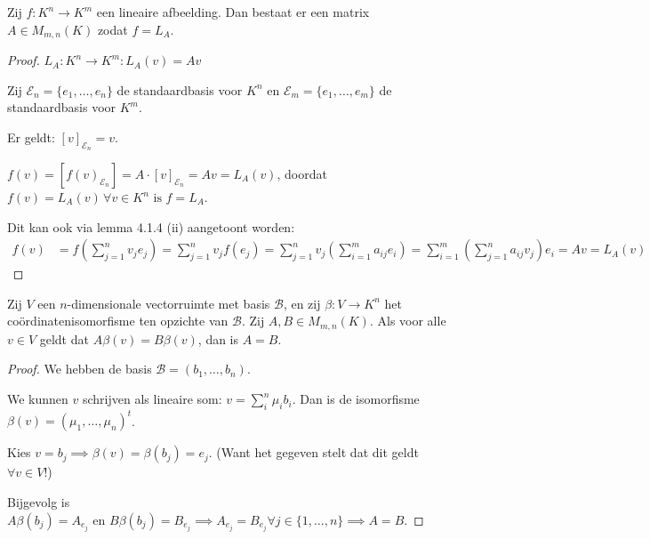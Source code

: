 \begin{gevolg}[4.1.6]
    Zij $f \colon K^n \to K^m$ een lineaire afbeelding. Dan bestaat er een matrix $A \in M_{m,n}(K)$ zodat $f = L_A$.
\end{gevolg}
\begin{proof}
    \(L_A: K^n \to K^m: L_A(v) = Av\)

    Zij \(\mathcal{E}_n = \{e_1, \dots, e_n\}\) de standaardbasis voor \(K^n\)
    en \(\mathcal{E}_m = \{e_1, \dots, e_m\}\) de standaardbasis voor \(K^m\).

    Er geldt: \([v]_{\mathcal{E}_n} = v\).

    \(f(v) =[f(v)_{\mathcal{E}_n}] = A \cdot [v]_{\mathcal{E}_n} = Av = L_A (v)\), doordat \(f(v) = L_A (v)\, \forall v \in K^n \text{ is } f = L_A.\)

    Dit kan ook via lemma 4.1.4 (ii) aangetoont worden:
    \begin{align*}
    f(v) &= f\left(\sum_{j=1}^n v_j e_j\right) 
    = \sum_{j=1}^n v_j f(e_j) 
    = \sum_{j=1}^n v_j \left( \sum_{i=1}^m a_{ij} e_i \right) 
    = \sum_{i=1}^m \left( \sum_{j=1}^n a_{ij} v_j \right) e_i 
    = A v = L_A(v)
    \end{align*}
\end{proof}

\begin{lemma}[4.1.7]
    Zij $V$ een $n$-dimensionale vectorruimte met basis $\mathcal{B}$, en zij $\beta \colon V \to K^n$ het coördinatenisomorfisme ten opzichte van $\mathcal{B}$. Zij $A, B \in M_{m,n}(K)$. Als voor alle $v \in V$ geldt dat $A\beta(v) = B\beta(v)$, dan is $A = B$.
\end{lemma}
\begin{proof}
    We hebben de basis \(\mathcal{B} = (b_1,\dots,b_n)\). 

    We kunnen \(v\) schrijven als lineaire som: \(v = \sum_i^n \mu_i b_i\). Dan is de isomorfisme \(\beta (v) = (\mu_1,\dots,\mu_n)^t\).

    Kies \(v = b_j \implies \beta (v)= \beta(b_j) = e_j\). (Want het gegeven stelt dat dit geldt \(\forall v \in V\)!)

    Bijgevolg is 
    \(A \beta(b_j) = A_{e_j} \text{ en } B \beta(b_j) =  B_{e_j} \implies A_{e_j} = B_{e_j} \forall j \in \{1,\dots,n\} \implies A=B\).
\end{proof}


